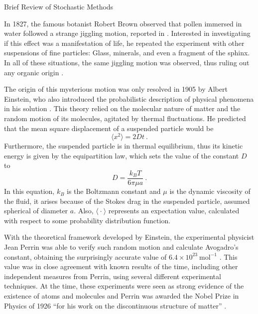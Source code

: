 \begin{chapter}{Brief Review of Stochastic Methods}
\label{chap:stoc}

\hspace{5 mm} 
In 1827, the famous botanist Robert Brown observed that pollen immersed
in water followed a strange jiggling motion,
reported in \textcite{brown1828}. Interested
in investigating if this effect was a manifestation
of life, he repeated the experiment with other suspensions
of fine particles: Glass, minerals, and even a fragment of
the sphinx. In all of these situations, the same jiggling motion
was observed, thus ruling out any organic origin
\parencite{gardiner2009}.

The origin of this mysterious motion was only resolved in 1905 by Albert Einstein,
who also introduced the probabilistic description of physical
phenomena in his solution \parencite{einstein1905}.
This theory relied on the molecular nature
of matter and the random motion of its molecules, agitated by
thermal fluctuations. He predicted that
the mean square displacement of a suspended particle would be
\begin{equation} \label{eq:displacement}
    \langle x^2 \rangle = 2 D t \ .
\end{equation}
Furthermore, the suspended particle is in thermal equilibrium,
thus its kinetic energy is given by the equipartition law,
which sets the value of the constant $D$ to
\begin{equation}
    D = \frac{k_B T}{6 \pi \mu a} \ .
\end{equation}
In this equation, $k_B$ is the Boltzmann constant and $\mu$ is the
dynamic viscosity of the fluid, it arises because of the Stokes drag in the
suspended particle, assumed spherical of diameter $a$.
Also, $\langle \ \bm\cdot \ \rangle$ represents an expectation value,
calculated with respect to some probability distribution function.

With the theoretical framework developed by Einstein, the
experimental physicist Jean Perrin was able to verify
such random motion and calculate Avogadro's constant,
obtaining the surprisingly accurate value of
$6.4 \times 10^{23} \ \mathrm{mol}^{-1}$ \parencite{perrinnobel}.
This value was in close agreement
with known results of the time, including other independent
measures from Perrin, using several different experimental techniques.
At the time, these experiments were seen as strong evidence
of the existence of atoms and molecules and
Perrin was awarded the Nobel Prize in Physics of 1926
\enquote{for his work on the discontinuous structure of matter}
\parencite{perrinAIP}.


\end{chapter}
